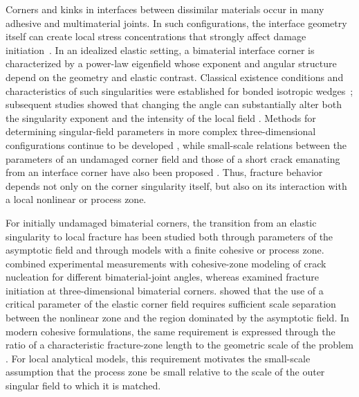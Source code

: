 \documentclass[pdflatex,iicol,sn-mathphys-ay]{sn-jnl}
\begin{document}
Corners and kinks in interfaces between dissimilar materials occur in many
adhesive and multimaterial joints. In such configurations, the interface
geometry itself can create local stress concentrations that strongly affect
damage initiation~\citep{GacoinEtAl2009}. In an idealized elastic setting, a
bimaterial interface corner is characterized by a power-law eigenfield whose
exponent and angular structure depend on the geometry and elastic contrast.
Classical existence conditions and characteristics of such singularities were
established for bonded isotropic wedges~\citep{BogyWang1971,DempseySinclair1981};
subsequent studies showed that changing the angle can substantially alter both
the singularity exponent and the intensity of the local field
\citep{MohammedLiechti2001}. Methods for determining singular-field parameters
in more complex three-dimensional configurations continue to be developed
\citep{MiyazakiFukudaNoda2025}, while small-scale relations between the
parameters of an undamaged corner field and those of a short crack emanating
from an interface corner have also been proposed
\citep{LyuZhangMai2026}. Thus, fracture behavior depends not only on the corner singularity itself,
but also on its interaction with a local nonlinear or process zone.

For initially undamaged bimaterial corners, the transition from an elastic
singularity to local fracture has been studied both through parameters of the
asymptotic field and through models with a finite cohesive or process zone.
\citet{MohammedLiechti2000} combined experimental measurements with cohesive-zone
modeling of crack nucleation for different bimaterial-joint angles, whereas
\citet{LabossiereDunn2001} examined fracture initiation at three-dimensional
bimaterial corners. \citet{AkisanyaMeng2003} showed that the use of a
critical parameter of the elastic corner field requires sufficient scale
separation between the nonlinear zone and the region dominated by the
asymptotic field. In modern cohesive formulations,
the same requirement is expressed through the ratio of a characteristic
fracture-zone length to the geometric scale of the problem
\citep{GormanThouless2022,ThoulessGoutianos2023}. For local analytical models, this requirement motivates the small-scale
assumption that the process zone be small relative to the scale of the outer
singular field to which it is matched.
\end{document}
